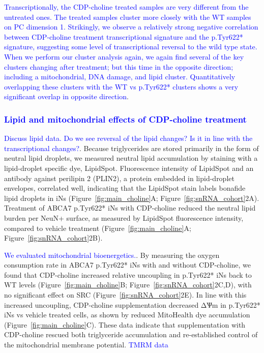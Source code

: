 \textcolor{blue}{Transcriptionally, the CDP-choline treated samples are very different from the untreated ones. The treated samples cluster more closely with the WT samples on PC dimension 1. Strikingly, we observe a relatively strong negative correlation between CDP-choline treatment transcriptional signature and the p.Tyr622* signature, suggesting some level of transcriptional reversal to the wild type state. When we perform our cluster analysis again, we again find several of the key clusters changing after treatment; but this time in the opposite direction; including a mitochondrial, DNA damage, and lipid cluster. Quantitatively overlapping these clusters with the WT vs p.Tyr622* clusters shows a very significant overlap in opposite direction}.

\subsubsection{\textcolor{blue}{Lipid and mitochondrial effects of CDP-choline treatment}}
\textcolor{blue}{Discuss lipid data. Do we see reversal of the lipid changes? Is it in line with the transcriptional changes?}. 
Because triglycerides are stored primarily in the form of neutral lipid droplets\cite{noauthor_2024-sd}, we measured neutral lipid accumulation by staining with a lipid-droplet specific dye, LipidSpot. Fluorescence intensity of  LipidSpot and an antibody against perilipin 2 (PLIN2), a protein embedded in lipid-droplet envelopes\cite{Olzmann2019-qv}, correlated well, indicating that the LipidSpot stain labels bonafide lipid droplets in iNs (Figure~\ref{fig:main_choline}A; Figure~\ref{fig:snRNA_cohort}2A). Treatment of ABCA7 p.Tyr622* iNs with CDP-choline reduced the neutral lipid burden per NeuN+ surface, as measured by LipidSpot fluorescence intensity, compared to vehicle treatment (Figure~\ref{fig:main_choline}A; Figure~\ref{fig:snRNA_cohort}2B). 

\textcolor{blue}{We evaluated mitochondrial bioenergetics.}. By measuring the oxygen consumption rate in ABCA7 p.Tyr622* iNs with and without CDP-choline, we found that CDP-choline increased relative uncoupling in p.Tyr622* iNs back to WT levels (Figure~\ref{fig:main_choline}B; Figure~\ref{fig:snRNA_cohort}2C,D), with no significant effect on SRC (Figure~\ref{fig:snRNA_cohort}2E). In line with this increased uncoupling, CDP-choline supplementation decreased ΔѰm in p.Tyr622* iNs vs vehicle treated cells, as shown by reduced MitoHealth dye accumulation (Figure~\ref{fig:main_choline}C). These data indicate that supplementation with CDP-choline rescued both triglyceride accumulation and re-established control of the mitochondrial membrane potential. \textcolor{blue}{TMRM data} 

